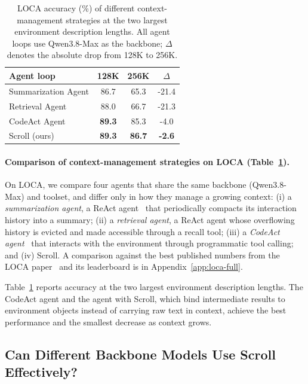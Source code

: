 \begin{table}[t]
\centering
\caption{LOCA accuracy (\%) of different context-management strategies at
the two largest environment description lengths. All agent loops use
Qwen3.8-Max as the backbone;
$\Delta$ denotes the absolute drop from 128K to 256K.}
\label{tab:loca-results}
\small
\begin{tabular}{lccc}
\toprule
Agent loop & 128K & 256K & $\Delta$ \\
\midrule
Summarization Agent            & 86.7 & 65.3 & -21.4 \\
Retrieval Agent           & 88.0 & 66.7 & -21.3 \\
CodeAct Agent                  & \textbf{89.3} & 85.3 & -4.0 \\
\midrule
Scroll (ours)                  & \textbf{89.3} & \textbf{86.7} & \textbf{-2.6} \\
\bottomrule
\end{tabular}
\end{table}

\paragraph{Comparison of context-management strategies on LOCA (Table~\ref{tab:loca-results}).}
On LOCA, we compare four agents that share the same backbone (Qwen3.8-Max) and toolset, and differ only in how they manage a growing context: (i) a \emph{summarization agent}, a ReAct agent~\citep{react} that periodically compacts its interaction history into a summary; (ii) a \emph{retrieval agent}, a ReAct agent whose overflowing history is evicted and made accessible through a recall tool; (iii) a \emph{CodeAct agent}~\citep{codeact} that interacts with the environment through programmatic tool calling; and (iv) Scroll. A comparison against the best published numbers from the LOCA paper~\citep{zeng2026loca} and its leaderboard is in Appendix~\ref{app:loca-full}.

Table~\ref{tab:loca-results} reports accuracy at the two largest environment description lengths. The CodeAct agent and the agent with Scroll, which bind intermediate results to environment objects instead of carrying raw text in context, achieve the best performance and the smallest decrease as context grows.


\subsection{Can Different Backbone Models Use Scroll Effectively?}
\label{sec:results-backbone}

